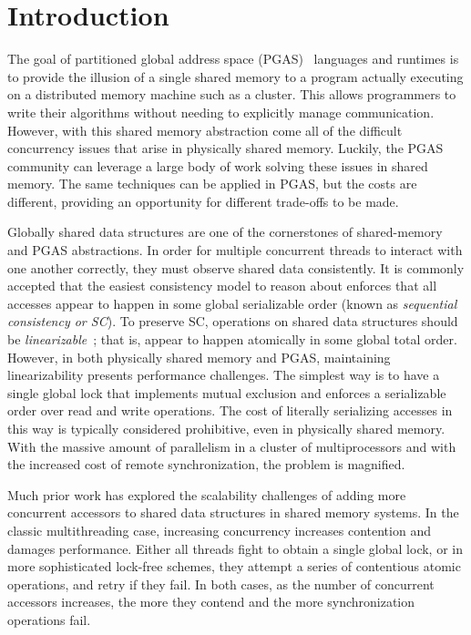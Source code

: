 \section{Introduction}
The goal of partitioned global address space (PGAS)~\cite{upc:2005} languages and runtimes is to provide the illusion of a single shared memory to a program actually executing on a distributed memory machine such as a cluster. This allows programmers to write their algorithms without needing to explicitly manage communication. 
However, with this shared memory abstraction come all of the difficult concurrency issues that arise in physically shared memory. Luckily, the PGAS community can leverage a large body of work solving these issues in shared memory.
The same techniques can be applied in PGAS, but the costs are different, providing an opportunity for different trade-offs to be made.

Globally shared data structures are one of the cornerstones of shared-memory and PGAS abstractions. 
In order for multiple concurrent threads to interact with one another correctly, they must observe shared data consistently. It is commonly accepted that the easiest consistency model to reason about enforces that all accesses appear to happen in some global serializable order (known as \emph{sequential consistency or SC}).
To preserve SC, operations on shared data structures should be \emph{linearizable}~\cite{herlihy1990linearizability}; that is, appear to happen atomically in some global total order.
However, in both physically shared memory and PGAS, maintaining linearizability presents performance challenges.
The simplest way is to have a single global lock that implements mutual exclusion and enforces a serializable order over read and write operations. The cost of literally serializing accesses in this way is typically considered prohibitive, even in physically shared memory.
With the massive amount of parallelism in a cluster of multiprocessors and with the increased cost of remote synchronization, the problem is magnified.

Much prior work has explored the scalability challenges of adding more concurrent accessors to shared data structures in shared memory systems.
In the classic multithreading case, increasing concurrency increases contention and damages performance.
Either all threads fight to obtain a single global lock, or in more sophisticated lock-free schemes, they attempt a series of contentious atomic operations, and retry if they fail. In both cases, as the number of concurrent accessors increases, the more they contend and the more synchronization operations fail.

